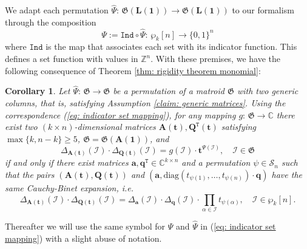 \documentclass[10pt]{article}
\newtheorem{cor}{Corollary}%
\theoremstyle{remark}%
\theoremstyle{definition}%
\begin{document}
We adapt each permutation $\widehat{\Psi}:\,\mathfrak{G}(\mathbf{L}(\mathbf{1}))\longrightarrow\mathfrak{G}(\mathbf{L}(\mathbf{1}))$ to our formalism through the composition 
 \begin{equation}
\Psi:=\mathtt{Ind}\circ\widehat{\Psi}:\,\wp_{k}[n]\longrightarrow\{0,1\}^{n}\label{eq: indicator set mapping}
 \end{equation}
where $\mathtt{Ind}$ is the map that associates each set with its indicator function. This defines a set function with values in $\mathbb{Z}^{n}$. With these premises, we have the following consequence of Theorem \ref{thm: rigidity theorem monomial}: 
\begin{cor}
\label{cor: permutation coding and reductions} Let $\widehat{\Psi}:\,\mathfrak{G}\longrightarrow\mathfrak{G}$ be a permutation of a matroid $\mathfrak{G}$ with two generic columns, that is, satisfying Assumption \ref{claim: generic matrices}. Using the correspondence (\ref{eq: indicator set mapping}), for any mapping $g:\,\mathfrak{G}\longrightarrow\mathbb{C}$ there exist two $(k\times n)$-dimensional matrices $\mathbf{A}(\mathbf{t}),\mathbf{Q}^{\mathtt{T}}(\mathbf{t})$ satisfying $\max\{k,n-k\}\geq 5$, $\mathfrak{G}=\mathfrak{G}(\mathbf{A}(\mathbf{1}))$, and 
 \begin{equation}
\Delta_{\mathbf{A}(\mathbf{t})}(\mathcal{I})\cdot\Delta_{\mathbf{Q}(\mathbf{t})}(\mathcal{I})=g(\mathcal{I})\cdot\mathbf{t}^{\Psi(\mathcal{I})},\quad\mathcal{I}\in\mathfrak{G}
\label{eq: terms of Cauchy-Binet expansion for permutation coding}
 \end{equation}
if and only if there exist matrices $\mathbf{a},\mathbf{q}^{\mathtt{T}}\in\mathbb{C}^{k\times n}$ and a permutation $\psi\in\mathcal{S}_{n}$ such that the pairs $(\mathbf{A}(\mathbf{t}),\mathbf{Q}(\mathbf{t}))$ and $(\mathbf{a},\mathrm{diag}(t_{\psi(1)},\dots,t_{\psi(n)})\cdot\mathbf{q})$ have the same Cauchy-Binet expansion, i.e. 
 \begin{equation}
\Delta_{\mathbf{A}(\mathbf{t})}(\mathcal{I})\cdot\Delta_{\mathbf{Q}(\mathbf{t})}(\mathcal{I})=\Delta_{\mathbf{a}}(\mathcal{I})\cdot\Delta_{\mathbf{q}}(\mathcal{I})\cdot\prod_{\alpha\in\mathcal{I}}t_{\psi(\alpha)},\quad\mathcal{I}\in\wp_{k}[n].
\label{eq: integrability for permutation coding}
 \end{equation}
\end{cor}
Thereafter we will use the same symbol for $\Psi$ and $\widehat{\Psi}$ in (\ref{eq: indicator set mapping}) with a slight abuse of notation. 
\end{document}
